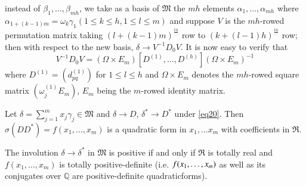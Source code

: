 \begin{remark*}
instead of $\beta_1,\ldots, \beta_{mh}$, we take as a basis of
$\mathfrak{M}$ the $mh$ elements $\alpha_1, \ldots, \alpha_{mh}$ where
$\alpha_{1+(k-1)m} = \omega_k \gamma_1(1\leq k \leq h, 1 \leq l \leq
m)$ and suppose $V$ is the $mh$-rowed permutation matrix taking
$(l+(k-1)m)^{\frac{th}{\cdots}}$ row to $(k+(l-1)h)^{\frac{th}{\cdots}}$
row; then with respect to the new basis, $\delta \rightarrow V^{-1}D_0
V$. It \pageoriginale is now easy to verify that 
\begin{equation*}
V^{-1} D_0 V = (\Omega \times E_m) [D^{(1)},\ldots, D^{(h)}] (\Omega
\times E_m)^{-1} \tag{22}\label{eq22}
\end{equation*}
where $D^{(1)} = (d^{(1)}_{pq})$ for $1\leq l \leq h$ and $\Omega
\times E_m$ denotes the $mh$-rowed square matrix $(\omega^{(1)}_j
E_m)$, $E_m$ being the $m$-rowed identity matrix.

Let $\delta = \sum\limits^m_{j=1} x_j \gamma_j \in \mathfrak{M}$ and
$\delta \rightarrow D$, $\delta^{\ast} \rightarrow D^{\ast}$ under
\eqref{eq20}. Then $\sigma(D D^{\ast}) = f(x_1, \ldots, x_m)$ is a quadratic
form in $x_1, \ldots x_m$ with coefficients in $\mathfrak{R}$.
\end{remark*}

\begin{proposition}\label{chap1:prop7}
The involution $\delta \rightarrow \delta^{\ast}$ in $\mathfrak{M}$ is
positive if and only if $\mathfrak{R}$ is totally real and $f(x_1,
\ldots, x_m)$ is totally positive-definite (i.e. $f(x_1,\ldots,\break x_m)$
as well as its conjugates over $\mathbb{Q}$ are positive-definite
quadratic\break forms).
\end{proposition}

